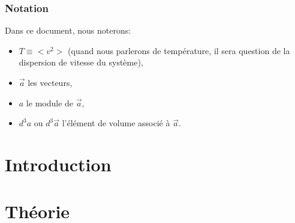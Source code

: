 \documentclass[a4paper,11pt,twoside,openright]{report}
\renewcommand{\(}{\ensuremath{\left(}}
\renewcommand{\)}{\ensuremath{\right)}}
\begin{document}
		

	\small \tableofcontents
	\listoffigures
	\normalsize

	\newpage

	\section*{Notation}
		Dans ce document, nous noterons:
		\begin{itemize}
			\item $T \equiv <v^2>$ (quand nous parlerons de température, il sera question de la dispersion de vitesse du système),
			\item $\vec{a}$ les vecteurs,
			\item $a$ le module de $\vec{a}$,
			\item $d^3 a$ ou $d^3 \vec{a}$ l'élément de volume associé à $\vec{a}$.
		\end{itemize}


	\part{Introduction}
	\pagestyle{these}

		

	\part{Théorie}
		
\end{document}
